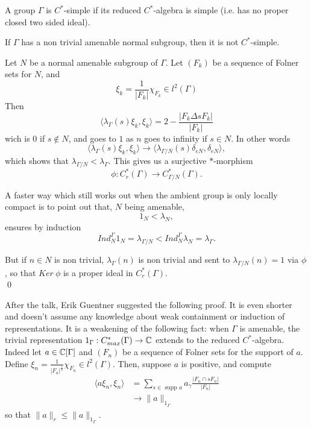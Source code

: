 \begin{definition}
A group $\Gamma$ is $C^*$-simple if its reduced $C^*$-algebra is simple (i.e. has no proper closed two sided ideal).
\end{definition}

\begin{thm}
If $\Gamma $ has a non trivial amenable normal subgroup, then it is not $C^*$-simple.
\end{thm}

\begin{dem}
Let $N$ be a normal amenable subgroup of $\Gamma$. Let $(F_k)$ be a sequence of Folner sets for $N$, and 
\[\xi_k =\frac{1}{|F_k|}\chi_{F_k}\in l^2(\Gamma)\]
Then
\[\langle \lambda_\Gamma(s)\xi_k, \xi_k\rangle = 2- \frac{|F_k \Delta sF_k |}{|F_k|} \]
wich is $0$ if $s\notin N$, and goes to $1$ as $n$ goes to infinity if $s\in N$. In other words
\[\langle \lambda_\Gamma(s)\xi_k, \xi_k\rangle \rightarrow \langle \lambda_{\Gamma/N}(s)\delta_{eN} , \delta_{eN} \rangle,\]
which shows that $\lambda_{\Gamma / N} < \lambda_\Gamma$. This gives us a surjective $*$-morphism 
\[\phi : C^*_r(\Gamma)\rightarrow C^*_{\Gamma/N}(\Gamma).\]

A faster way which still works out when the ambient group is only locally compact is to point out that, $N$ being amenable, 
\[1_N < \lambda_N,\]
ensures by induction 
\[Ind_N^\Gamma 1_N = \lambda_{\Gamma / N} < Ind_N^\Gamma \lambda_N= \lambda_{\Gamma }.\]

But if $n\in N$ is non trivial, $\lambda_{\Gamma}(n)$ is non trivial and sent to $\lambda_{\Gamma /N}(n) = 1$ via $\phi$, so that $Ker\ \phi$ is a proper ideal in $C^*_r(\Gamma)$.\\	
\qed	 
\end{dem}

After the talk, Erik Guentner suggested the following proof. It is even shorter and doesn't assume any knowledge about weak containment or induction of representations. It is a weakening of the following fact: when $\Gamma$ is amenable, the trivial representation $1_\Gamma : C^*_{max}(\Gamma)\rightarrow \mathbb C$ extends to the reduced $C^*$-algebra.\\

Indeed let $a\in \mathbb C [\Gamma]$ and $(F_n)$ be a sequence of Folner sets for the support of $a$. Define $\xi_n = \frac{1}{|F_n|^\frac{1}{2}} \chi_{F_n} \in l^2(\Gamma )$. Then, suppose $a$ is positive, and compute
\[\begin{split}
\langle a \xi_n , \xi_n \rangle & = \sum_{s\in \text{ supp }a} a_\gamma \frac{|F_n \cap sF_n|}{|F_n|} \\ 
				& \rightarrow \| a \|_{1_\Gamma}
\end{split}\]
so that $ \| a\|_r \leq \| a\|_{1_\Gamma} $.\\

